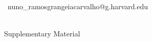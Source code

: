 \documentclass{article}
\begin{document}
\begin{tcbposter}
{\begin{minipage}[c]{0.235\linewidth}
\begin{minipage}[c]{0.66\linewidth}
      \faEnvelope\ nuno\_ramosgrangeiacarvalho@\allowbreak g.harvard.edu\par
    \end{minipage}\hspace{0.35in}%
    \begin{minipage}[c]{0.28\linewidth}\centering
      \colorbox{white}{\color{black}}\\[0.2em]
      {\fontsize{25}{30}\selectfont Supplementary Material}
    \end{minipage}
  \end{minipage}\hspace*{0.3in}%
}

\newcommand{\relswatch}[1]{\textcolor{#1}{\rule[0.18em]{1.6em}{0.32em}}}
\newcommand{\relname}[2]{\relswatch{#1}\hspace{0.5em}{\color{#1}\bfseries #2}}
\newcommand{\tablesize}{\fontsize{30}{38}\selectfont}
\newcommand{\subhead}[1]{{\color{navy}\bfseries\fontsize{40}{48}\selectfont #1\par}\smallskip}
\newcommand{\refcite}[1]{{\color{navy}[#1]}}


\end{tcbposter}
\end{document}
